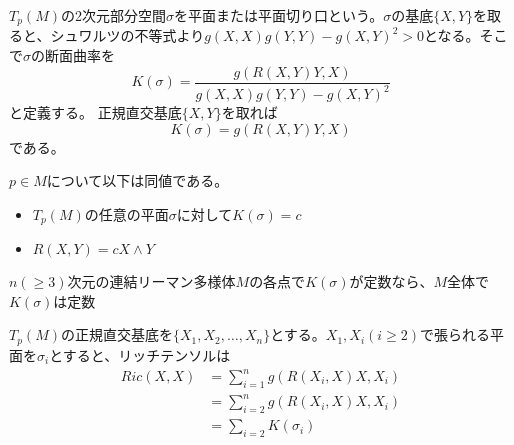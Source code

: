         $T_p(M)$の2次元部分空間$\sigma$を平面または平面切り口という。$\sigma$の基底$\{X, Y\}$を取ると、シュワルツの不等式より$g(X, X)g(Y, Y) - g(X, Y)^2 > 0$となる。そこで$\sigma$の断面曲率を
            \[K(\sigma) = \frac{g(R(X, Y)Y, X)}{g(X, X)g(Y, Y) - g(X, Y)^2}\]
        と定義する。
        正規直交基底$\{X, Y\}$を取れば
            \[K(\sigma) = g(R(X, Y)Y, X)\]
        である。
        \begin{thm}
            $p \in M$について以下は同値である。
            \begin{itemize}
                \item $T_p(M)$の任意の平面$\sigma$に対して$K(\sigma) = c$
                \item $R(X, Y) = cX \wedge Y$
            \end{itemize}
        \end{thm}
        \begin{thm}[シューアの定理]
            $n(\geq 3)$次元の連結リーマン多様体$M$の各点で$K(\sigma)$が定数なら、$M$全体で$K(\sigma)$は定数
        \end{thm}

        $T_p(M)$の正規直交基底を$\{X_1, X_2, \dots, X_n\}$とする。$X_1, X_i(i \geq 2)$で張られる平面を$\sigma_i$とすると、リッチテンソルは
        \begin{align*}
            Ric(X, X) &= \sum_{i=1}^n g(R(X_i, X)X, X_i)\\
            &= \sum_{i=2}^n g(R(X_i, X)X, X_i)\\
            &= \sum_{i=2} K(\sigma_i)\\
        \end{align*}